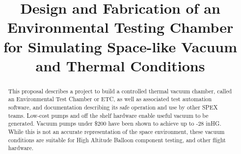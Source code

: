 \documentclass[conference]{IEEEtran} %
\title{Design and Fabrication of an Environmental Testing Chamber for Simulating Space-like Vacuum and Thermal Conditions}
\author{
  \IEEEauthorblockN{%
    T.J.~Tarazevits\IEEEauthorrefmark{1},
  }
  \IEEEauthorblockA{%
    RIT Space Exploration, Rochester Institute of Technology \\ %
    Rochester, N.Y. \\
    Email:
    \IEEEauthorrefmark{1}tjt3085@rit.edu,
  }

}
\begin{document}
\maketitle%

\begin{abstract}
  This proposal describes a project to build a controlled thermal vacuum chamber, called an Environmental Test Chamber or ETC, as well as associated test automation software, and documentation describing its safe operation and use by other SPEX teams. Low-cost pumps and off the shelf hardware enable useful vacuum to be generated. Vacuum pumps under \$200 have been shown to achieve up to -28 inHG. While this is not an accurate representation of the space environment, these vacuum conditions are suitable for High Altitude Balloon component testing, and other flight hardware. \cite{vacChamberExp}

\end{abstract}

\label{sec:nomenclature}
\newcommand{\nomunit}[1]{%
\renewcommand{\nomentryend}{\hspace*{\fill}#1}}
\renewcommand{\nompreamble}{

  }
\printnomenclature{}
\end{document}
